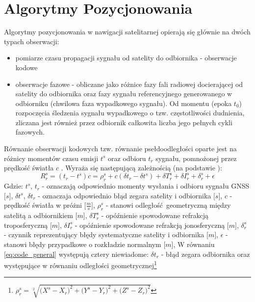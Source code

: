 \section{Algorytmy Pozycjonowania}
Algorytmy pozycjonowania w nawigacji satelitarnej opierają się głównie na dwóch typach obserwacji: 
\begin{itemize}
	\item pomiarze czasu propagacji sygnału od satelity do odbiornika - obserwacje kodowe
	\item obserwacje fazowe - obliczane jako różnice fazy fali radiowej docierającej od satelity do odbiornika oraz fazy sygnału referencyjnego 
	generowanego w odbiorniku (chwilowa faza wypadkowego sygnału). Od momentu (epoka $t_0$) rozpoczęcia śledzenia sygnału wypadkowego o tzw. częstotliwości dudnienia,
	zliczana jest również przez odbiornik całkowita liczba jego pełnych cykli fazowych.
\end{itemize}
\indent Równanie obserwacji kodowych tzw. równanie psełdoodległości oparte jest na różnicy momentów czasu emisji $t^s$ oraz odbioru $t_r$ sygnału, pomnożonej 
przez prędkość światła $c$ \cite[][strona 11]{BOSY_2005}. Wyraża się następującą zależnością (na podstawie \cite[]{BOSY_2005}):
\begin{equation}
	R_r^s = (t_r - t^s)c = \rho_r^s + c({\delta}t_r - {\delta}t^s) + {\delta}T_r^s + {\delta}I_r^s + {\delta}_r^s + \epsilon
	\label{eq:code_general}
\end{equation}
Gdzie:
$t^s$, $t_r$ - oznaczają odpowiednio momenty wysłania i odbioru sygnału GNSS $\big[s\big]$,\newline
${\delta}t^s$, ${\delta}t_r$ - oznaczaja odpowiednio błąd zegara satelity i odbiornika $\big[s\big]$,\newline
$c$ - prędkość światła w próżni $\big[\frac{m}{s}\big]$,\newline
$\rho_r^s$ - stanowi odległość geometryczną między satelitą a odbiornikiem $\big[m\big]$,\newline
${\delta}T_r^s$ - opóźnienie spowodowane refrakcją troposferyczną $\big[m\big]$,\newline
${\delta}I_r^s$ - opóźnienie spowodowane refrakcją jonosferyczną $\big[m\big]$,\newline
${\delta}_r^s$ - czynnik reprezentujący błędy systematyczne satelity i odbiornika $\big[m\big]$,\newline
$\epsilon$ - stanowi błędy przypadkowe o rozkładzie normalnym $\big[m\big]$,\newline
W równaniu \ref{eq:code_general} występują cztery niewiadome: ${\delta}t_r$ - błąd zegara odbiornika oraz występujące w równaniu odległości geometrycznej\footnote{
${\rho}_r^s = \sqrt[2]{{\big(X^s - X_r\big)}^2 + {\big(Y^s - Y_r\big)}^2 + {\big(Z^s - Z_r\big)}^2}$}
